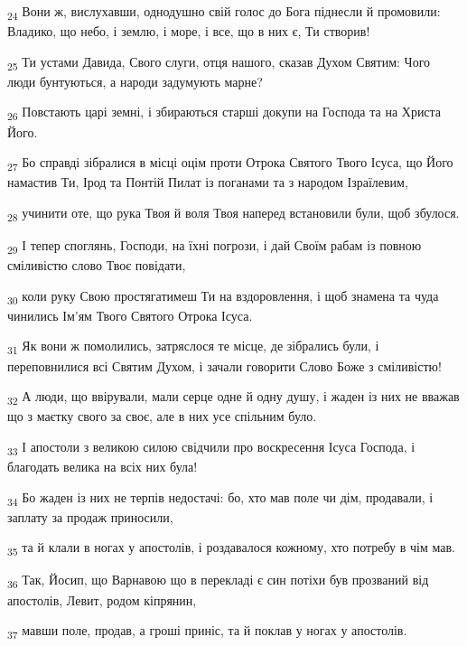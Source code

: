 \begin{tcolorbox}
\textsubscript{24} Вони ж, вислухавши, однодушно свій голос до Бога піднесли й промовили: Владико, що небо, і землю, і море, і все, що в них є, Ти створив!
\end{tcolorbox}
\begin{tcolorbox}
\textsubscript{25} Ти устами Давида, Свого слуги, отця нашого, сказав Духом Святим: Чого люди бунтуються, а народи задумують марне?
\end{tcolorbox}
\begin{tcolorbox}
\textsubscript{26} Повстають царі земні, і збираються старші докупи на Господа та на Христа Його.
\end{tcolorbox}
\begin{tcolorbox}
\textsubscript{27} Бо справді зібралися в місці оцім проти Отрока Святого Твого Ісуса, що Його намастив Ти, Ірод та Понтій Пилат із поганами та з народом Ізраїлевим,
\end{tcolorbox}
\begin{tcolorbox}
\textsubscript{28} учинити оте, що рука Твоя й воля Твоя наперед встановили були, щоб збулося.
\end{tcolorbox}
\begin{tcolorbox}
\textsubscript{29} І тепер споглянь, Господи, на їхні погрози, і дай Своїм рабам із повною сміливістю слово Твоє повідати,
\end{tcolorbox}
\begin{tcolorbox}
\textsubscript{30} коли руку Свою простягатимеш Ти на вздоровлення, і щоб знамена та чуда чинились Ім'ям Твого Святого Отрока Ісуса.
\end{tcolorbox}
\begin{tcolorbox}
\textsubscript{31} Як вони ж помолились, затряслося те місце, де зібрались були, і переповнилися всі Святим Духом, і зачали говорити Слово Боже з сміливістю!
\end{tcolorbox}
\begin{tcolorbox}
\textsubscript{32} А люди, що ввірували, мали серце одне й одну душу, і жаден із них не вважав що з маєтку свого за своє, але в них усе спільним було.
\end{tcolorbox}
\begin{tcolorbox}
\textsubscript{33} І апостоли з великою силою свідчили про воскресення Ісуса Господа, і благодать велика на всіх них була!
\end{tcolorbox}
\begin{tcolorbox}
\textsubscript{34} Бо жаден із них не терпів недостачі: бо, хто мав поле чи дім, продавали, і заплату за продаж приносили,
\end{tcolorbox}
\begin{tcolorbox}
\textsubscript{35} та й клали в ногах у апостолів, і роздавалося кожному, хто потребу в чім мав.
\end{tcolorbox}
\begin{tcolorbox}
\textsubscript{36} Так, Йосип, що Варнавою що в перекладі є син потіхи був прозваний від апостолів, Левит, родом кіпрянин,
\end{tcolorbox}
\begin{tcolorbox}
\textsubscript{37} мавши поле, продав, а гроші приніс, та й поклав у ногах у апостолів.
\end{tcolorbox}
